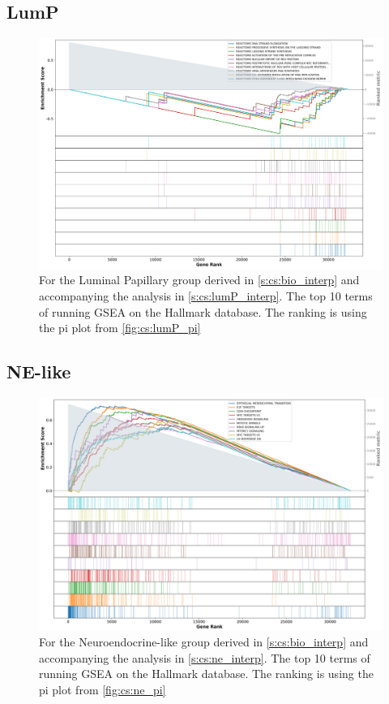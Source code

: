 \subsection{LumP}


\begin{figure}[H]    
    \centering
\includegraphics[width=1.0\textwidth,keepaspectratio]{Sections/ClusteringAnalysis/Resources/discussion/other_groups/lumP2_hallmark_10_top.png}
     \caption{For the Luminal Papillary group derived in \cref{s:cs:bio_interp} and accompanying the analysis in \cref{s:cs:lumP_interp}. The top 10 terms of running GSEA on the Hallmark database. The ranking is using the pi plot from \cref{fig:cs:lumP_pi}}
    \label{fig:ap:cs:gsea_lump_hallmark}
\end{figure}


\subsection{NE-like}


\begin{figure}[H]    
    \centering
\includegraphics[width=1.0\textwidth,keepaspectratio]{Sections/ClusteringAnalysis/Resources/discussion/other_groups/ne2_hallmark_10_top.png}
     \caption{For the Neuroendocrine-like group derived in \cref{s:cs:bio_interp} and accompanying the analysis in \cref{s:cs:ne_interp}. The top 10 terms of running GSEA on the Hallmark database. The ranking is using the pi plot from \cref{fig:cs:ne_pi}}
    \label{fig:ap:cs:gsea_ne_hallmark}
\end{figure}
